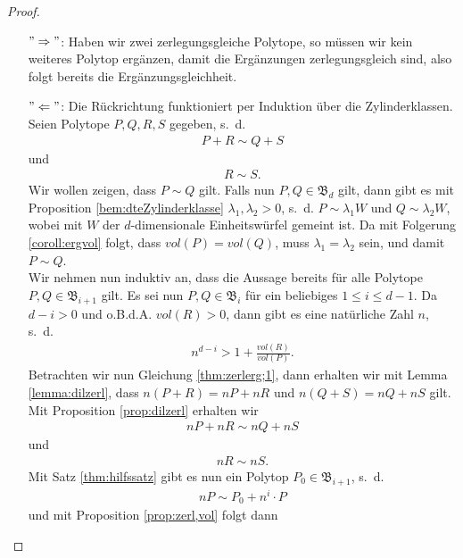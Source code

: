 \documentclass[11pt,titlepage]{article}
\theoremstyle{definition}
\theoremstyle{remark}
\begin{document}
	\begin{proof}
		\noindent
		\begin{itemize}
			\item[$"\Rightarrow"$:] Haben wir zwei zerlegungsgleiche Polytope, so müssen wir kein weiteres Polytop ergänzen, damit die Ergänzungen zerlegungsgleich sind, also folgt bereits die Ergänzungsgleichheit.
			
			\item[$"\Leftarrow"$:] Die Rückrichtung funktioniert per 
			Induktion über die Zylinderklassen. Seien Polytope 
			$P,Q,R,S$ gegeben, s.~d. 
			\begin{align}
			P+R\sim Q+S \label{thm:zerlerg;1}
			\end{align}
			und
			\begin{align}
			R\sim S. \label{thm:zerlerg;2}
			\end{align}
			Wir wollen zeigen, dass $P\sim Q$ gilt. 
			Falls nun $P,Q\in \mathfrak{B}_d$ gilt, dann gibt es mit 
			Proposition \ref{bem:dteZylinderklasse} 
			$\lambda_1,\lambda_2 >0$, s.~d. $P\sim \lambda_1 W$ und 
			$Q\sim \lambda_2 W$, wobei mit $W$ der $d$-dimensionale 
			Einheitswürfel gemeint ist. Da mit Folgerung \ref{coroll:ergvol} 
			folgt, dass $vol(P)=vol(Q)$, muss $\lambda_1 =\lambda_2$ sein, und 
			damit $P\sim Q$. \\
			Wir nehmen nun induktiv an, dass die Aussage bereits für alle 
			Polytope $P,Q\in\mathfrak{B}_{i+1}$ gilt. Es sei nun  
			$P,Q\in\mathfrak{B}_i$ für ein beliebiges $1\leq i\leq d-1$. 
			Da $d-i>0$ und o.B.d.A. $vol(R)>0$, dann gibt es eine natürliche Zahl $n$, s.~d. 
			\begin{align}
			n^{d-i}>1+\frac{vol(R)}{vol(P)}. \label{thm:zerlerg;3}
			\end{align}
			Betrachten wir nun Gleichung \ref{thm:zerlerg;1}, dann erhalten wir 
			mit Lemma \ref{lemma:dilzerl}, dass $n(P+R)=nP+nR$ und $n(Q+S)=nQ+nS$ 
			gilt. Mit Proposition \ref{prop:dilzerl} erhalten wir 
			\begin{align}
			nP+nR\sim nQ+nS \label{thm:zerlerg;4}
			\end{align}
			und
			\begin{align}
			nR\sim nS. \label{thm:zerlerg;5}
			\end{align}
			Mit Satz \ref{thm:hilfssatz} gibt es nun ein Polytop 
			$P_0\in\mathfrak{B}_{i+1}$, s.~d.
			\begin{align}
			nP\sim P_0 +n^i\cdot P \label{thm:zerlerg;6}
			\end{align}
			und mit Proposition \ref{prop:zerl,vol} folgt dann

\end{itemize}
\end{proof}
\end{document}
